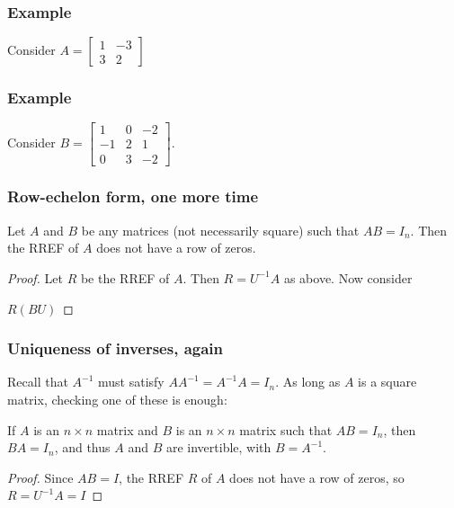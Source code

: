 \documentclass[11pt,t]{beamer}
\begin{document}
\begin{frame}
\frametitle{Example}
Consider $A = \begin{bmatrix}1&-3\\3&2\end{bmatrix}$
\end{frame}
\begin{frame}
\frametitle{Example}
Consider $B = \begin{bmatrix}1&0&-2\\-1&2&1\\0&3&-2\end{bmatrix}$.
\end{frame}
\begin{frame}
\frametitle{Row-echelon form, one more time}
\begin{theorem}
Let $A$ and $B$ be any matrices (not necessarily square) such that $AB=I_n$. Then the RREF of $A$ does not have a row of zeros.
\end{theorem}
\begin{proof}
Let $R$ be the RREF of $A$. Then $R=U^{-1}A$ as above. Now consider

\bigskip

$R(BU)$

\vspace{1in}

\end{proof}
\end{frame}
\begin{frame}
\frametitle{Uniqueness of inverses, again}
Recall that $A^{-1}$ must satisfy $AA^{-1}=A^{-1}A=I_n$. As long as $A$ is a \alert{square} matrix, checking one of these is enough:
\begin{theorem}
If $A$ is an $n\times n$ matrix and $B$ is an $n\times n$ matrix such that $AB=I_n$, then $BA=I_n$, and thus $A$ and $B$ are invertible, with $B=A^{-1}$.
\end{theorem}
\begin{proof}
Since $AB=I$, the RREF $R$ of $A$ does not have a row of zeros, so $R=U^{-1}A=I$

\vspace{1in}
\end{proof}
\end{frame}
\end{document}
